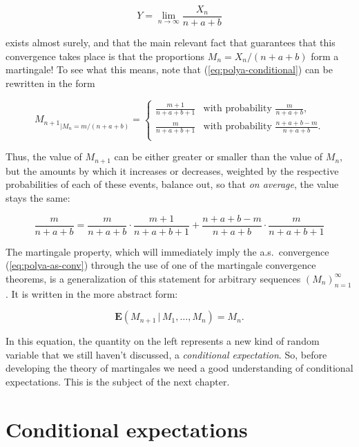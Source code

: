 \documentclass[11pt]{report}
\theoremstyle{plain}
\theoremstyle{definition}
\begin{document}
\begin{equation*} \tag{4}\label{eq:polya-as-conv}
Y = \lim_{n\to\infty} \frac{X_n}{n+a+b}
\end{equation*}

exists almost surely, and that the main relevant fact that guarantees that this convergence takes place is that the proportions $M_n = X_n/(n+a+b)$ form a martingale! To see what this means, note that (\ref{eq:polya-conditional}) can be rewritten in the form

\[
{M_{n+1}}_{\big| M_n = m/(n+a+b)} =
\begin{cases}
\frac{m+1}{n+a+b+1} & \textrm{with probability }\frac{m}{n+a+b}, \\
\frac{m}{n+a+b+1} & \textrm{with probability }\frac{n+a+b-m}{n+a+b}. \\
\end{cases}
\]

Thus, the value of $M_{n+1}$ can be either greater or smaller than the value of $M_n$, but the amounts by which it increases or decreases, weighted by the respective probabilities of each of these events, balance out, so that \emph{on average}, the value stays the same:

\[
\frac{m}{n+a+b} = \frac{m}{n+a+b}\cdot \frac{m+1}{n+a+b+1} +
\frac{n+a+b-m}{n+a+b} \cdot \frac{m}{n+a+b+1}
\]

The martingale property, which will immediately imply the a.s.\ convergence (\ref{eq:polya-as-conv}) through the use of one of the martingale convergence theorems, is a generalization of this statement for arbitrary sequences $(M_n)_{n=1}^\infty$. It is written in the more abstract form:

\[
\mathbf{E}\left(M_{n+1}\,|\,M_1,\ldots,M_n\right) = M_n.
\]

In this equation, the quantity on the left represents a new kind of random variable that we still haven't discussed, a \emph{conditional expectation}. So, before developing the theory of martingales we need a good understanding of conditional expectations. This is the subject of the next chapter.

\chapter{Conditional expectations}
\end{document}
